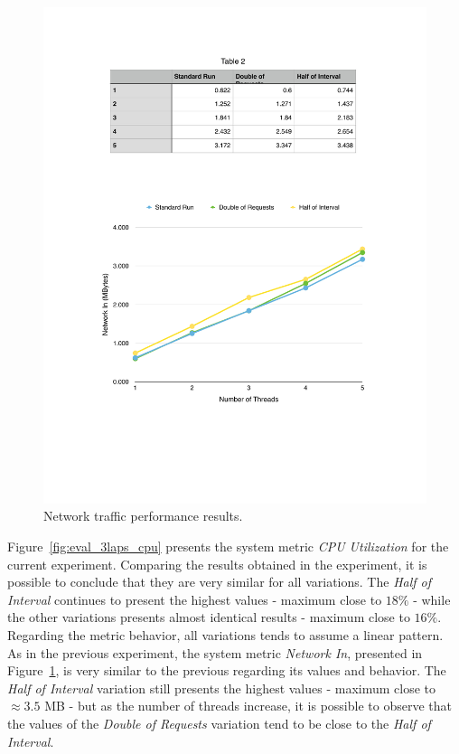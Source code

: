 \begin{figure}[ht!]
  \centering
  \includegraphics[width=.75\textwidth]{./images/network_3_lap}
  \caption{Network traffic performance results.}
  \label{fig:eval_3laps_network}
\end{figure}

Figure~\ref{fig:eval_3laps_cpu} presents the system metric \textit{CPU Utilization} for the current
experiment. Comparing the results obtained in the experiment, it is possible to conclude that
they are very similar for all variations. The \textit{Half of Interval} continues to present
the highest values - maximum close to $18\%$ - while the other variations presents almost identical
results - maximum close to $16\%$. Regarding the metric behavior, all variations tends to assume
a linear pattern.\\

As in the previous experiment, the system metric \textit{Network In}, presented in Figure~\ref{fig:eval_3laps_network},
is very similar to the previous regarding its values and behavior. The \textit{Half of Interval}
variation still presents the highest values - maximum close to $\approx3.5$ \gls{MB} - but as the number of
threads increase, it is possible to observe that the values of the \textit{Double of Requests}
variation tend to be close to the \textit{Half of Interval}.

